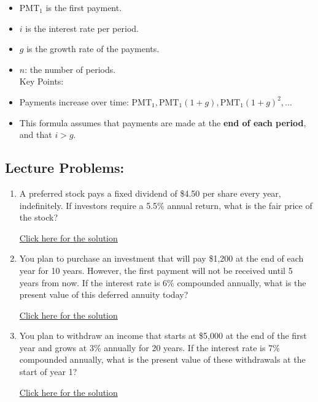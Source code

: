 \documentclass[
]{book}
\providecommand{\tightlist}{%
  \setlength{\itemsep}{0pt}\setlength{\parskip}{0pt}}
\begin{document}
\begin{enumerate}
  \begin{itemize}
  \tightlist
  \item
    \(\text{PMT}_1\) is the first payment.
  \item
    \(i\) is the interest rate per period.
  \item
    \(g\) is the growth rate of the payments.
  \item
    \(n\): the number of periods.\\
    Key Points:
  \item
    Payments increase over time: \(\text{PMT}_1, \text{PMT}_1(1+g), \text{PMT}_1(1+g)^2, \dots\)
  \item
    This formula assumes that payments are made at the \textbf{end of each period}, and that \(i > g\).
  \end{itemize}
\end{enumerate}

\subsection*{Lecture Problems:}\label{lecture-problems-16}

\begin{enumerate}
\def\labelenumi{\arabic{enumi}.}
\tightlist
\item
  A preferred stock pays a fixed dividend of \$4.50 per share every year, indefinitely. If investors require a 5.5\% annual return, what is the fair price of the stock?

  \href{https://youtu.be/DcH6X7vmuJI}{Click here for the solution}
\item
  You plan to purchase an investment that will pay \$1,200 at the end of each year for 10 years. However, the first payment will not be received until 5 years from now. If the interest rate is 6\% compounded annually, what is the present value of this deferred annuity today?

  \href{https://youtu.be/KKtTShNruXk}{Click here for the solution}
\item
  You plan to withdraw an income that starts at \$5,000 at the end of the first year and grows at 3\% annually for 20 years. If the interest rate is 7\% compounded annually, what is the present value of these withdrawals at the start of year 1?

  \href{https://youtu.be/MgdL-JOsw38}{Click here for the solution}
\end{enumerate}
\end{document}
